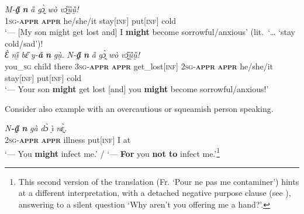 \documentclass[output=paper,colorlinks,citecolor=brown
]{langscibook}
\begin{document}
\z



\ea \label{ex:Fed13}
\ea \label{ex:Fed13a}
\gll \textit{M-\textbf{a̰̋}} \textit{\textbf{n{\ù}}} \textit{ȁ} \textit{gɔ̰̀} \textit{wò} \textit{vɔ̰̏ṵ̏ṵ̏!} \\
\textsc{1sg-\textbf{appr}} \textbf{\textsc{appr}} he/she/it stay[\textsc{inf}] put\textsc{[inf]} cold \\
 `--- [My son might get lost and] I \textbf{might} become sorrowful/anxious' (lit.\ `{\dots} `stay cold/sad')! \\
\ex \label{ex:Fed13b}
\gll \textit{Ɛ̀} \textit{nı̰̋} \textit{bɛ̏} \textit{y-\textbf{ǎ}} \textit{\textbf{n{\ù}}} \textit{gṵ̀{\à}.} \textit{N-\textbf{a̰̋}} \textit{\textbf{n{\ù}}} \textit{ȁ} \textit{gɔ̰̀} \textit{wò} \textit{vɔ̰̏ṵ̏ṵ̏!} \\
you\_\textsc{sg} child there \textsc{3sg-\textbf{appr}} \textsc{\textbf{appr}} get\_lost[\textsc{inf}] \textsc{2sg-\textbf{appr}} \textsc{\textbf{appr}} he/she/it stay[\textsc{inf}] put\textsc{[inf]} cold \\
 `--- Your son \textbf{might} get lost [and] you \textbf{might} become sorrowful/anxious!'
\z
\z

 Consider also example  with an overcautious or squeamish person speaking.


\ea \label{ex:Fed14}
\gll \textit{N\textbf{-a̰̋}} \textit{\textbf{n{\ù}}} \textit{gà} \textit{dɔ̀} \textit{ı̰̀} \textit{nɛ̰̀.} \\
\textsc{2sg-\textbf{appr}} \textsc{\textbf{appr}} illness put\textsc{[inf]} I at \\
 `--- You \textbf{might} infect me.' / `--- \textbf{For} you \textbf{not to} infect me.'\footnote{This second version of the translation (Fr. `Pour ne pas me contaminer') hints at a different interpretation, with a detached negative purpose clause (see ), answering to a silent question `Why aren't you offering me a hand?'.}
\z
\end{document}
